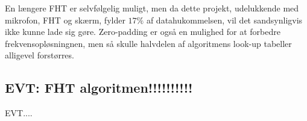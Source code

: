 En længere FHT er selvfølgelig muligt, men da dette projekt, udelukkende med mikrofon, FHT og skærm, fylder $17 \%$ af datahukommelsen, vil det sandsynligvis ikke kunne lade sig gøre. 
Zero-padding er også en mulighed for at forbedre frekvensopløsningnen, men så skulle halvdelen af algoritmens look-up tabeller alligevel forstørres. 

\subsection{EVT: FHT algoritmen!!!!!!!!!!}

EVT.... 